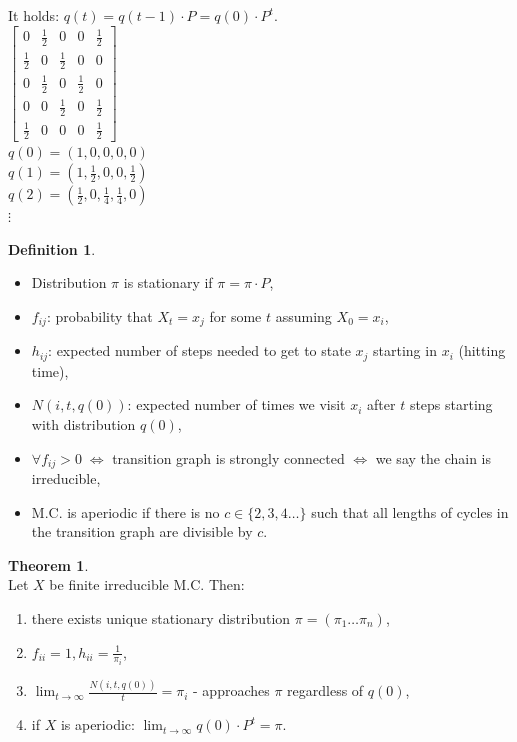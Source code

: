\documentclass[a4paper, 12pt]{book}
\theoremstyle{definition}
\newtheorem{defn}[counter]{Definition}
\newtheorem{theorem}[counter]{Theorem}
\theoremstyle{remark}
\begin{document}
It holds: $q(t) = q(t-1) \cdot P = q(0) \cdot P^t$. \\
$\begin{bmatrix}
  0 & \frac{1}{2} & 0 & 0 & \frac{1}{2} \\
  \frac{1}{2} & 0 & \frac{1}{2} & 0 & 0 \\
  0 & \frac{1}{2} & 0 & \frac{1}{2} & 0 \\
  0 & 0 & \frac{1}{2} & 0 & \frac{1}{2} \\
  \frac{1}{2} & 0 & 0 & 0 & \frac{1}{2}
\end{bmatrix}$ \\
$q(0) = (1, 0, 0, 0, 0)$ \\
$q(1) = (1, \frac{1}{2}, 0, 0, \frac{1}{2})$ \\
$q(2) = (\frac{1}{2}, 0, \frac{1}{4}, \frac{1}{4}, 0)$ \\
$\vdots$ \\
\begin{defn} \text{} \\
  \begin{itemize}
    \item Distribution $\pi$ is stationary if $\pi = \pi \cdot P$,
    \item $f_{ij}$: probability that $X_t = x_j$ for some $t$ assuming $X_0 = x_i$,
    \item $h_{ij}$: expected number of steps needed to get to state $x_j$ starting in $x_i$ (hitting time),
    \item $N(i, t, q(0))$: expected number of times we visit $x_i$ after $t$ steps starting with distribution $q(0)$,
    \item $\forall f_{ij} > 0 \; \iff$ transition graph is strongly connected $\iff$ we say the chain is irreducible,
    \item M.C. is aperiodic if there is no $c \in \{2, 3, 4 \dots\}$ such that all lengths of cycles in the transition graph are divisible by $c$.
  \end{itemize}
\end{defn}
\begin{theorem} \text{} \\
  Let $X$ be finite irreducible M.C. Then:
  \begin{enumerate}[label=\alph*)]
    \item there exists unique stationary distribution $\pi = (\pi_1 \dots \pi_n)$,
    \item $f_{ii} = 1, h_{ii} = \frac{1}{\pi_i}$,
    \item $\lim_{t \to \infty} \frac{N(i, t, q(0))}{t} = \pi_i$ - approaches $\pi$ regardless of $q(0)$,
    \item if $X$ is aperiodic: $\lim_{t \to \infty} q(0) \cdot P^t = \pi$. 
  \end{enumerate}
\end{theorem}
\end{document}
